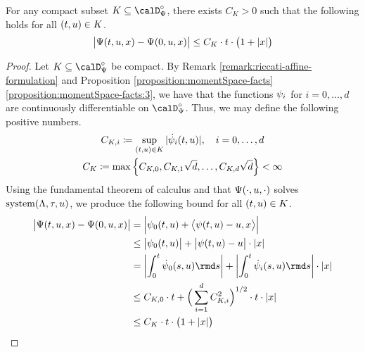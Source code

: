 \begin{proposition}
  \label{proposition:aff-differentiable}
  For any compact subset $K \subseteq \momentSpace^\circ$, there exists $C_K > 0$ such that the following holds for all $(t, u) \in K$.
  \begin{equation*}
    \big| \Psi(t, u, x) - \Psi(0, u, x) \big| \leq C_K \cdot t \cdot \big( 1 + |x| \big)
  \end{equation*}
\end{proposition}
\begin{proof}
  \label{proof:proposition:aff-differentiable}
  Let $K \subseteq \momentSpace^\circ$ be compact.
  By Remark \ref{remark:riccati-affine-formulation} and Proposition \ref{proposition:momentSpace-facts}\ref{proposition:momentSpace-facts:3}, we have that the functions $\psi_i$ for $i = 0, \ldots, d$ are continuously differentiable on $\momentSpace^\circ$.
  Thus, we may define the following positive numbers.
  \begin{gather*}
    C_{K,i} \coloneqq \sup_{(t, u) \in K} |\dot{\psi}_i(t, u)|, \quad i = 0, \ldots, d \\
    C_K \coloneqq \max\Big\{ C_{K,0}, C_{K,1}\sqrt d, \ldots, C_{K,d} \sqrt d \Big\} < \infty
  \end{gather*}
  Using the fundamental theorem of calculus and that $\Psi(\cdot,u,\cdot)$ solves $\operatorname{system}(\Lambda,\tau,u)$, we produce the following bound for all $(t, u) \in K$.
  \begin{align*}
    \big|\aff(t, \momentVar, \stateVar) - \aff(0, \momentVar, \stateVar)\big| 
    &= \Big| \affPart_0(t, \momentVar) + \bprj{\affPart(t, \momentVar) - \momentVar}{\stateVar} \Big| \\
    &\leq \big|\affPart_0(t,\momentVar)\big| + \big|\affPart(t,\momentVar) - \momentVar\big| \cdot |\stateVar| \\
    &= \left| \int_0^t \dot\affPart_0(s,\momentVar) \rmd s \right|
      + \left| \int_0^t \dot\affPart_i(s,\momentVar) \rmd s \right| \cdot |\stateVar| \\
    &\leq C_{K,0} \cdot t + \Big( \sum_{i=1}^d C_{K,i}^2 \Big)^{1/2} \cdot t \cdot |\stateVar| \\
    &\leq C_K  \cdot t \cdot \big( 1 + |\stateVar| \big)
  \end{align*}
\end{proof}
